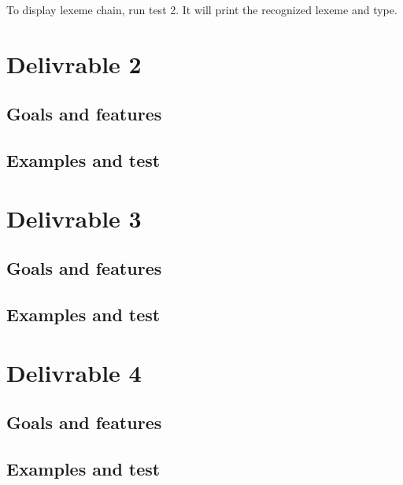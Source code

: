 \documentclass[twoside,twocolumn]{article}
\begin{document}
To display lexeme chain, run test 2. It will print the recognized lexeme and type.


\section{Delivrable 2}

\subsection{Goals and features}

\subsection{Examples and test}


\section{Delivrable 3}

\subsection{Goals and features}

\subsection{Examples and test}


\section{Delivrable 4}

\subsection{Goals and features}

\subsection{Examples and test}


\end{document}
